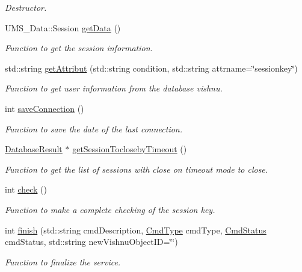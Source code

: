 \begin{DoxyCompactItemize}
\begin{DoxyCompactList}\small\item\em Destructor. \item\end{DoxyCompactList}\item 
UMS\_\-Data::Session \hyperlink{classSessionServer_a4c23b390fd8d49b83f34a57c1d7e1b23}{getData} ()
\begin{DoxyCompactList}\small\item\em Function to get the session information. \item\end{DoxyCompactList}\item 
std::string \hyperlink{classSessionServer_af3fce86cf1e28afee1b44ac35b925925}{getAttribut} (std::string condition, std::string attrname=\char`\"{}sessionkey\char`\"{})
\begin{DoxyCompactList}\small\item\em Function to get user information from the database vishnu. \item\end{DoxyCompactList}\item 
int \hyperlink{classSessionServer_a479f3e2aee3b4c5009e8f496612ae9bc}{saveConnection} ()
\begin{DoxyCompactList}\small\item\em Function to save the date of the last connection. \item\end{DoxyCompactList}\item 
\hyperlink{classDatabaseResult}{DatabaseResult} $\ast$ \hyperlink{classSessionServer_a21db5603b7a91581d5860d1b24f38cd5}{getSessionToclosebyTimeout} ()
\begin{DoxyCompactList}\small\item\em Function to get the list of sessions with close on timeout mode to close. \item\end{DoxyCompactList}\item 
int \hyperlink{classSessionServer_a97647ee61a04b91e9b220fb0700910b7}{check} ()
\begin{DoxyCompactList}\small\item\em Function to make a complete checking of the session key. \item\end{DoxyCompactList}\item 
int \hyperlink{classSessionServer_ab1a59010af4f2e4f9ad19c078a38e1b0}{finish} (std::string cmdDescription, \hyperlink{namespacevishnu_a89462b396eca68c9c1a94a06d2f39532}{CmdType} cmdType, \hyperlink{namespacevishnu_a5513f86dabac3cd717c915498a7679ad}{CmdStatus} cmdStatus, std::string newVishnuObjectID=\char`\"{}\char`\"{})
\begin{DoxyCompactList}\small\item\em Function to finalize the service. \item\end{DoxyCompactList}\end{DoxyCompactItemize}
